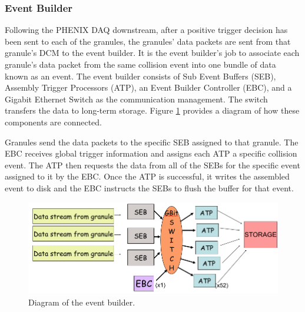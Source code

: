 
\subsubsection{Event Builder}
Following the PHENIX DAQ downstream, after a positive trigger decision has been sent to each of the granules, the granules' data packets are sent from that granule's DCM to the event builder. It is the event builder's job to associate each granule's data packet from the same collision event into one bundle of data known as an event. The event builder consists of Sub Event Buffers (SEB), Assembly Trigger Processors (ATP), an Event Builder Controller (EBC), and a Gigabit Ethernet Switch as the communication management. The switch transfers the data to long-term storage. Figure \ref{fig:evb_diag} provides a diagram of how these components are connected.

Granules send the data packets to the specific SEB assigned to that granule. The EBC receives global trigger information and assigns each ATP a specific collision event. The ATP then requests the data from all of the SEBs for the specific event assigned to it by the EBC. Once the ATP is successful, it writes the assembled event to disk and the EBC instructs the SEBs to flush the buffer for that event.

\begin{figure}[h!]
\begin{center}
\includegraphics[width=0.73\linewidth]{figs/evb_diagram.png}
\caption{Diagram of the event builder. }\label{fig:evb_diag}
\end{center}
\end{figure}



